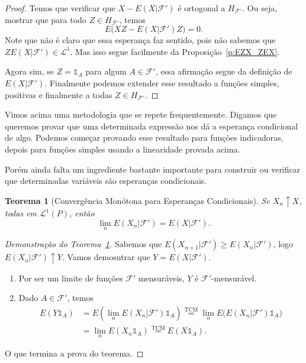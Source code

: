 \documentclass[reqno]{article}
\newcommand*\1{\mathds{1}}
\newtheorem{theorem}{Teorema}[section]
\begin{document}
\begin{proof}
  Temos que verificar que $X - E(X|\mathcal{F}')$ é ortogonal a $H_{\mathcal{F}'}$.
  Ou seja, mostrar que para todo $Z \in H_{\mathcal{F}'}$, temos
  \begin{equation}
    E\big( XZ - E(X|\mathcal{F}') Z \big) = 0.
  \end{equation}
  Note que não é claro que essa esperança faz sentido, pois não sabemos que $ZE(X|\mathcal{F}') \in \mathcal{L}^1$.
  Mas isso segue facilmente da Proposição~\ref{p:EZX_ZEX}.

  Agora sim, se $Z = \1_{A}$ para algum $A \in \mathcal{F}'$, essa afirmação segue da definição de $E(X|\mathcal{F}')$.
  Finalmente podemos extender esse resultado a funções simples, positivas e finalmente a todas $Z \in H_{\mathcal{F}'}$.
\end{proof}

Vimos acima uma metodologia que se repete frequentemente.
Digamos que queremos provar que uma determinada expressão nos dá a esperança condicional de algo.
Podemos começar provando esse resultado para funções indicadoras, depois para funções simples usando a linearidade provada acima.

Porém ainda falta um ingrediente bastante importante para construir ou verificar que determinadas variáveis são esperanças condicionais.

\begin{theorem}[Convergência Monótona para Esperanças Condicionais]
  \label{t:TCM_EC}
  Se $X_n \uparrow X$, todas em $\mathcal{L}^1(P)$, então
  \begin{equation}
    \lim_n E(X_n|\mathcal{F}') = E(X|\mathcal{F}').
  \end{equation}
\end{theorem}

\begin{proof}[Demonstração do Teorema~\ref{t:TCM_EC}]
  Sabemos que $E(X_{n+1} | \mathcal{F}') \geq E(X_n|\mathcal{F}')$, logo $E(X_n|\mathcal{F}') \uparrow Y$.
  Vamos demosntrar que $Y = E(X|\mathcal{F}')$.
  \begin{enumerate}
  \item Por ser um limite de funções $\mathcal{F}'$ mensuráveis, $Y$ é $\mathcal{F}'$-mensurável.
  \item Dado $A \in \mathcal{F}'$, temos
    \begin{equation}
      \begin{split}
        E(Y \1_A) & = E(\lim_n E(X_n |\mathcal{F}') \1_A) \overset{\text{TCM}}= \lim_n E\big( E(X_n|\mathcal{F}') \1_A \big)\\
        & = \lim_n E(X_n \1_A) \overset{\text{TCM}}= E(X \1_A).
      \end{split}
    \end{equation}
  \end{enumerate}
  O que termina a prova do teorema.
\end{proof}
\end{document}
